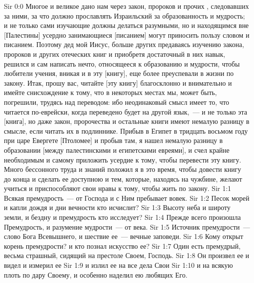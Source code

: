 \vs Sir 0:0 Многое и великое дано нам через закон, пророков и прочих , следовавших за ними, за что должно прославлять  Израильский за образованность и мудрость; и не только сами изучающие должны делаться разумными, но и находящимся вне [Палестины] усердно занимающиеся [писанием] могут приносить пользу словом и писанием. Поэтому дед мой Иисус, больше других предаваясь изучению закона, пророков и других отеческих книг и приобретя достаточный в них навык, решился и сам написать нечто, относящееся к образованию и мудрости, чтобы любители учения, вникая и в эту [книгу], еще более преуспевали в жизни по закону. Итак, прошу вас, читайте [эту книгу] благосклонно и внимательно и имейте снисхождение к тому, что в некоторых местах мы, может быть, погрешили, трудясь над переводом: ибо неодинаковый смысл имеет то, что читается по-еврейски, когда переведено будет на другой язык,~--- и не только эта [книга], но даже закон, пророчества и остальные книги имеют немалую разницу в смысле, если читать их в подлиннике. Прибыв в Египет в тридцать восьмом году при царе Евергете [Птоломее] и пробыв там, я нашел немалую разницу в образовании [между палестинскими и египетскими евреями], и счел крайне необходимым и самому приложить усердие к тому, чтобы перевести эту книгу. Много бессонного труда и знаний положил я в это время, чтобы довести книгу до конца и сделать ее доступною и тем, которые, находясь на чужбине, желают учиться и приспособляют свои нравы к тому, чтобы жить по закону.
\vs Sir 1:1 Всякая премудрость~--- от Господа и с Ним пребывает вовек.
\vs Sir 1:2 Песок морей и капли дождя и дни вечности кто исчислит?
\vs Sir 1:3 Высоту неба и широту земли, и бездну и премудрость кто исследует?
\vs Sir 1:4 Прежде всего произошла Премудрость, и разумение мудрости~--- от века.
\vs Sir 1:5 Источник премудрости~--- слово Бога Всевышнего, и шествие ее~--- вечные заповеди.
\vs Sir 1:6 Кому открыт корень премудрости? и кто познал искусство ее?
\vs Sir 1:7 Один есть премудрый, весьма страшный, сидящий на престоле Своем, Господь.
\vs Sir 1:8 Он произвел ее и видел и измерил ее
\vs Sir 1:9 и излил ее на все дела Свои
\vs Sir 1:10 и на всякую плоть по дару Своему, и особенно наделил ею любящих Его.
